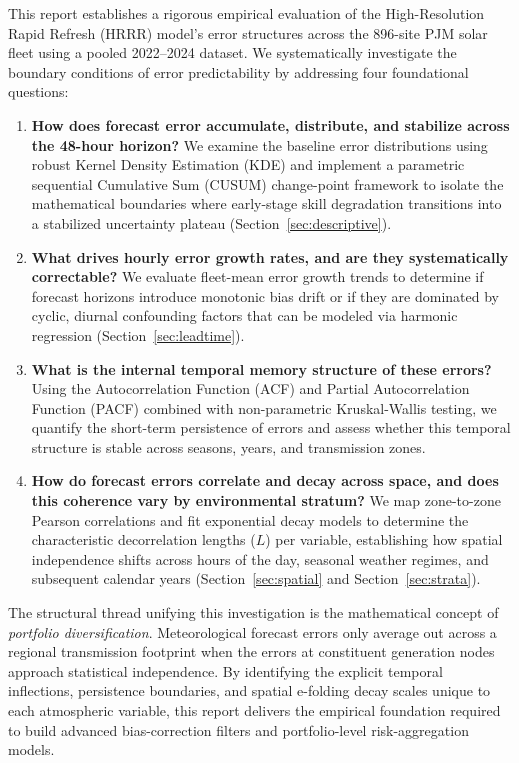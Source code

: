This report establishes a rigorous empirical evaluation of the High-Resolution Rapid Refresh (HRRR) model's error structures across the 896-site PJM solar fleet using a pooled 2022–2024 dataset. We systematically investigate the boundary conditions of error predictability by addressing four foundational questions:
\begin{enumerate}
  \item \textbf{How does forecast error accumulate, distribute, and stabilize across the 48-hour horizon?} We examine the baseline error distributions using robust Kernel Density Estimation (KDE) and implement a parametric sequential Cumulative Sum (CUSUM) change-point framework to isolate the mathematical boundaries where early-stage skill degradation transitions into a stabilized uncertainty plateau (Section~\ref{sec:descriptive}).
  \item \textbf{What drives hourly error growth rates, and are they systematically correctable?} We evaluate fleet-mean error growth trends to determine if forecast horizons introduce monotonic bias drift or if they are dominated by cyclic, diurnal confounding factors that can be modeled via harmonic regression (Section~\ref{sec:leadtime}).
  \item \textbf{What is the internal temporal memory structure of these errors?} Using the Autocorrelation Function (ACF) and Partial Autocorrelation Function (PACF) combined with non-parametric Kruskal-Wallis testing, we quantify the short-term persistence of errors and assess whether this temporal structure is stable across seasons, years, and transmission zones.
  \item \textbf{How do forecast errors correlate and decay across space, and does this coherence vary by environmental stratum?} We map zone-to-zone Pearson correlations and fit exponential decay models to determine the characteristic decorrelation lengths ($L$) per variable, establishing how spatial independence shifts across hours of the day, seasonal weather regimes, and subsequent calendar years (Section~\ref{sec:spatial} and Section~\ref{sec:strata}).
\end{enumerate}

The structural thread unifying this investigation is the mathematical concept of \emph{portfolio diversification}. Meteorological forecast errors only average out across a regional transmission footprint when the errors at constituent generation nodes approach statistical independence. By identifying the explicit temporal inflections, persistence boundaries, and spatial e-folding decay scales unique to each atmospheric variable, this report delivers the empirical foundation required to build advanced bias-correction filters and portfolio-level risk-aggregation models.